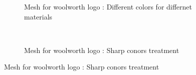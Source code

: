 \begin{figure}[h!]
    \begin{subfigure}[b]{1\linewidth}
        \centering
        \caption{Mesh for woolworth logo : Different colors for differnet materials}
    \end{subfigure}
    \\
    \begin{subfigure}[b]{1\linewidth}
        \centering
        \caption{Mesh for woolworth logo : Sharp conors treatment}
    \end{subfigure}
\end{figure}

